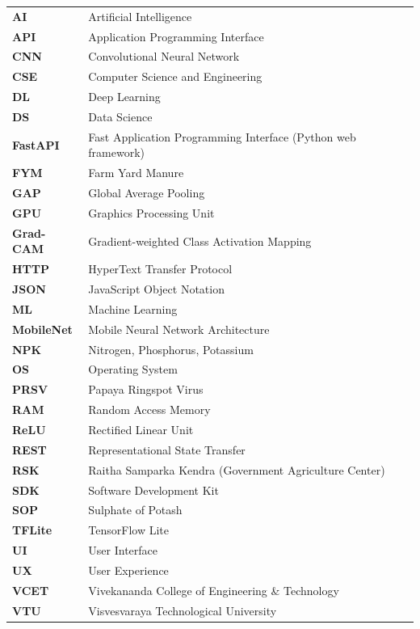 \documentclass[12pt,a4paper]{report}
\begin{document}
\begin{tabular}{ll}
\textbf{AI}        & Artificial Intelligence \\
\textbf{API}       & Application Programming Interface \\
\textbf{CNN}       & Convolutional Neural Network \\
\textbf{CSE}       & Computer Science and Engineering \\
\textbf{DL}        & Deep Learning \\
\textbf{DS}        & Data Science \\
\textbf{FastAPI}   & Fast Application Programming Interface (Python web framework) \\
\textbf{FYM}       & Farm Yard Manure \\
\textbf{GAP}       & Global Average Pooling \\
\textbf{GPU}       & Graphics Processing Unit \\
\textbf{Grad-CAM}  & Gradient-weighted Class Activation Mapping \\
\textbf{HTTP}      & HyperText Transfer Protocol \\
\textbf{JSON}      & JavaScript Object Notation \\
\textbf{ML}        & Machine Learning \\
\textbf{MobileNet} & Mobile Neural Network Architecture \\
\textbf{NPK}       & Nitrogen, Phosphorus, Potassium \\
\textbf{OS}        & Operating System \\
\textbf{PRSV}      & Papaya Ringspot Virus \\
\textbf{RAM}       & Random Access Memory \\
\textbf{ReLU}      & Rectified Linear Unit \\
\textbf{REST}      & Representational State Transfer \\
\textbf{RSK}       & Raitha Samparka Kendra (Government Agriculture Center) \\
\textbf{SDK}       & Software Development Kit \\
\textbf{SOP}       & Sulphate of Potash \\
\textbf{TFLite}    & TensorFlow Lite \\
\textbf{UI}        & User Interface \\
\textbf{UX}        & User Experience \\
\textbf{VCET}      & Vivekananda College of Engineering \& Technology \\
\textbf{VTU}       & Visvesvaraya Technological University \\
\end{tabular}
\end{document}
